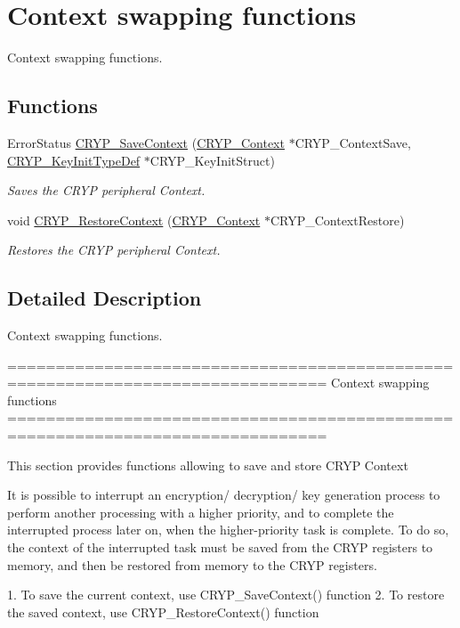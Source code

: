 \hypertarget{group___c_r_y_p___group3}{}\section{Context swapping functions}
\label{group___c_r_y_p___group3}


Context swapping functions.  


\subsection*{Functions}
\begin{DoxyCompactItemize}
\item 
Error\+Status \hyperlink{group___c_r_y_p___group3_ga41a14be7fa43d500e7c94cce40910ea8}{C\+R\+Y\+P\+\_\+\+Save\+Context} (\hyperlink{struct_c_r_y_p___context}{C\+R\+Y\+P\+\_\+\+Context} $\ast$C\+R\+Y\+P\+\_\+\+Context\+Save, \hyperlink{struct_c_r_y_p___key_init_type_def}{C\+R\+Y\+P\+\_\+\+Key\+Init\+Type\+Def} $\ast$C\+R\+Y\+P\+\_\+\+Key\+Init\+Struct)
\begin{DoxyCompactList}\small\item\em Saves the C\+R\+Y\+P peripheral Context. \end{DoxyCompactList}\item 
void \hyperlink{group___c_r_y_p___group3_gaf2986782fa66ea95b2a389595e17e0e5}{C\+R\+Y\+P\+\_\+\+Restore\+Context} (\hyperlink{struct_c_r_y_p___context}{C\+R\+Y\+P\+\_\+\+Context} $\ast$C\+R\+Y\+P\+\_\+\+Context\+Restore)
\begin{DoxyCompactList}\small\item\em Restores the C\+R\+Y\+P peripheral Context. \end{DoxyCompactList}\end{DoxyCompactItemize}


\subsection{Detailed Description}
Context swapping functions. 

\begin{DoxyVerb} ===============================================================================
                             Context swapping functions
 ===============================================================================  

  This section provides functions allowing to save and store CRYP Context

  It is possible to interrupt an encryption/ decryption/ key generation process 
  to perform another processing with a higher priority, and to complete the 
  interrupted process later on, when the higher-priority task is complete. To do 
  so, the context of the interrupted task must be saved from the CRYP registers 
  to memory, and then be restored from memory to the CRYP registers.
   
  1. To save the current context, use CRYP_SaveContext() function
  2. To restore the saved context, use CRYP_RestoreContext() function \end{DoxyVerb}
 

